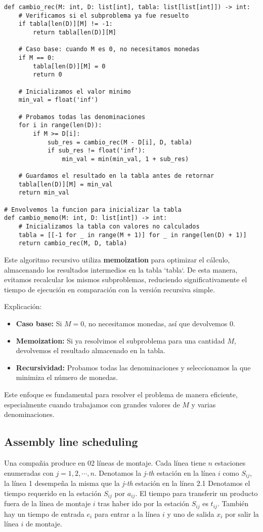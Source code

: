\documentclass[tikz,11pt,fleqn]{book} %
\begin{document}
\begin{lstlisting}
def cambio_rec(M: int, D: list[int], tabla: list[list[int]]) -> int:
    # Verificamos si el subproblema ya fue resuelto
    if tabla[len(D)][M] != -1:
        return tabla[len(D)][M]

    # Caso base: cuando M es 0, no necesitamos monedas
    if M == 0:
        tabla[len(D)][M] = 0
        return 0

    # Inicializamos el valor minimo
    min_val = float('inf')

    # Probamos todas las denominaciones
    for i in range(len(D)):
        if M >= D[i]:
            sub_res = cambio_rec(M - D[i], D, tabla)
            if sub_res != float('inf'):
                min_val = min(min_val, 1 + sub_res)

    # Guardamos el resultado en la tabla antes de retornar
    tabla[len(D)][M] = min_val
    return min_val

# Envolvemos la funcion para inicializar la tabla
def cambio_memo(M: int, D: list[int]) -> int:
    # Inicializamos la tabla con valores no calculados
    tabla = [[-1 for _ in range(M + 1)] for _ in range(len(D) + 1)]
    return cambio_rec(M, D, tabla)
\end{lstlisting}

Este algoritmo recursivo utiliza \textbf{memoization} para optimizar el cálculo, almacenando los resultados intermedios en la tabla `tabla`. De esta manera, evitamos recalcular los mismos subproblemas, reduciendo significativamente el tiempo de ejecución en comparación con la versión recursiva simple.

Explicación:

\begin{itemize}
	\item\textbf{Caso base:} Si $M=0$, no necesitamos monedas, así que devolvemos 0.
	\item\textbf{Memoization:} Si ya resolvimos el subproblema para una cantidad $M$, devolvemos el resultado almacenado en la tabla.
	\item\textbf{Recursividad:} Probamos todas las denominaciones y seleccionamos la que minimiza el número de monedas.
\end{itemize}

Este enfoque es fundamental para resolver el problema de manera eficiente, especialmente cuando trabajamos con grandes valores de $M$ y varias denominaciones.


\subsection{Assembly line scheduling    }
Una compañia produce en 02 líneas de montaje. Cada línea tiene $n$ estaciones enumeradas con $j=1,2,\cdots,n$. Denotamos la \textit{j-th} estación en la línea $i$ como $S_{ij}$, la línea 1 desempeña la misma que la \textit{j-th} estación en la línea 2.1
Denotamos el tiempo requerido en la estación $S_{ij}$ por $a_{ij}$. El tiempo para transferir un producto fuera de la línea de montaje $i$ tras haber ido por la estación $S_{ij}$ es $t_{ij}$.
También hay un tiempo de entrada $e_i$ para entrar a la línea $i$ y uno de salida $x_i$ por salir la línea $i$ de montaje.
\end{document}
